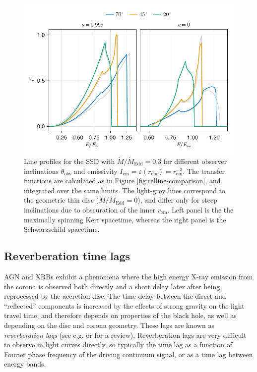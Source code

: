 \documentclass[fleqn,usenatbib]{mnras}
\begin{document}
\begin{figure}
	\centering
	\includegraphics[width=0.99\linewidth]{figures/lineprofiles.ssd.pdf}
	\caption{Line profiles for the SSD with $\dot{M} / \dot{M}_\text{Edd} = 0.3$ for different observer inclinations $\theta_\text{obs}$ and emissivity $I_\text{em} = \varepsilon(r_\text{em}) = r_\text{em}^{-3}$. The transfer functions are calculated as in Figure \ref{fig:relline-comparison}, and integrated over the same limits. The light-grey lines correspond to the geometric thin disc ($\dot{M} / \dot{M}_\text{Edd} = 0$), and differ only for steep inclinations due to obscuration of the inner $r_\text{em}$. Left panel is the the maximally spinning Kerr spacetime, whereas the right panel is the Schwarzschild spacetime.}
	\label{fig:line-profile-ssd}
\end{figure}


\subsection{Reverberation time lags}
\label{sec:lag-transfer-functions}

AGN and XRBs exhibit a phenomena where the high energy X-ray emission from the
corona is observed both directly and a short delay later after being reprocessed
by the accretion disc. The time delay between the direct and ``reflected''
components is increased by the effects of strong gravity on the light travel
time, and therefore depends on properties of the black hole, as well as depending on the disc and corona geometry. These lags are
known as \textit{reverberation lags} (see e.g. \cite{uttley_x-ray_2014} or
\cite{cackett_reverberation_2021} for a review). Reverberation lags are
very difficult to observe in light curves directly, so
typically the time lag as a function of Fourier phase frequency of
the driving continuum signal, or as a time lag between energy bands.
\end{document}
